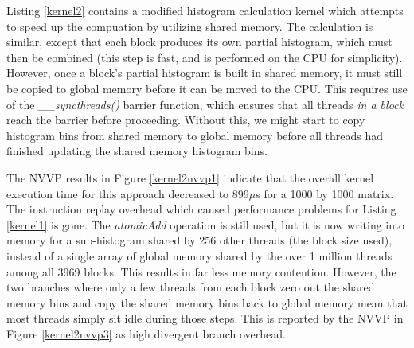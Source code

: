 \documentclass{article}
\begin{document}
Listing \ref{kernel2} contains a modified histogram calculation kernel which attempts to speed up the compuation by utilizing shared memory. The calculation is similar, except that each block produces its own partial histogram, which must then be combined (this step is fast, and is performed on the CPU for simplicity). However, once a block's partial histogram is built in shared memory, it must still be copied to global memory before it can be moved to the CPU. This requires use of the \emph{\_\_syncthreads()} barrier function, which ensures that all threads \emph{in a block} reach the barrier before proceeding. Without this, we might start to copy histogram bins from shared memory to global memory before all threads had finished updating the shared memory histogram bins.

The NVVP results in Figure \ref{kernel2nvvp1} indicate that the overall kernel execution time for this approach decreased to 899$\mu$s for a 1000 by 1000 matrix. The instruction replay overhead which caused performance problems for Listing \ref{kernel1} is gone. The \emph{atomicAdd} operation is still used, but it is now writing into memory for a sub-histogram shared by 256 other threads (the block size used), instead of a single array of global memory shared by the over 1 million threads among all 3969 blocks. This results in far less memory contention. However, the two branches where only a few threads from each block zero out the shared memory bins and copy the shared memory bins back to global memory mean that most threads simply sit idle during those steps. This is reported by the NVVP in Figure \ref{kernel2nvvp3} as high divergent branch overhead.
\end{document}
